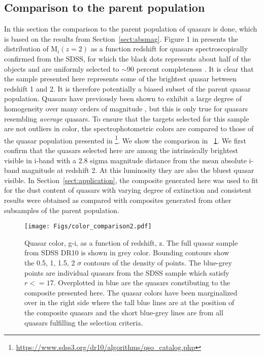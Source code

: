 \documentclass{aa}    %
\newcommand{\figref}[1]{\ref{fig:#1}}
\newcommand{\Fig}[1]{\figurename~\figref{#1}}
\newcommand{\fig}[1]{\Fig{#1}}
\newcommand{\figlabel}[1]{\label{fig:#1}}
\newcommand{\sectionname}{Section}
\newcommand{\Sect}[1]{\sectionname~\ref{sect:#1}}
\newcommand{\sect}[1]{\Sect{#1}}
\newcommand{\sectlabel}[1]{\label{sect:#1}}
\begin{document}
\subsection{Comparison to the parent population}  \sectlabel{parents}
In this section the comparison to the parent population of quasars is done, which is based on the results from \sect{absmag}.
Figure 1 in \cite{Shen2011} presents the distribution of M$_i(z=2)$ as a function redshift for quasars spectroscopically confirmed from the SDSS, for which the black dots represents about half of the objects and are uniformly selected to $\sim$90 percent completeness \citet{Richards2002, VandenBerk2005}. It is clear that the sample presented here represents some of the brightest quasar between redshift 1 and 2. It is therefore potentially a biased subset of the parent quasar population. Quasars have previously been shown to exhibit a large degree of homogeneity over many orders of magnitude \citep{Dietrich2002}, but this is only true for quasars resembling \textit{average} quasars. To ensure that the targets selected for this sample are not outliers in color, the spectrophotometric colors are compared to those of the quasar population presented in \citet{Paris2014}\footnote{\url{https://www.sdss3.org/dr10/algorithms/qso_catalog.php}}. We show the comparison in \fig{color_comparison}. We first confirm that the quasars selected here are among the intrinsically brightest visible in i-band with a 2.8 sigma magnitude distance from the mean absolute i-band magnitude at redshift 2. At this luminosity they are also the bluest quasar visible. In \sect{application}, the composite generated here was used to fit for the dust content of quasars with varying degree of extinction and consistent results were obtained as compared with composites generated from other subsamples of the parent population.


 \begin{figure}[hbtp]
   \centering
   \texttt{[image: Figs/color\_comparison2.pdf]}
   \caption[]{Quasar color, g-i,  as a function of redshift, z. The full quasar sample from SDSS DR10 \citep{Paris2014} is shown in grey color. Bounding contours show the 0.5, 1, 1.5, 2 $\sigma$ contours of the density of points. The blue-grey points are individual quasars from the SDSS sample which satisfy $r <= 17$. Overplotted in blue are the quasars constibuting to the composite presented here. The quasar colors have been marginalized over in the right side where the tall blue lines are at the position of the composite quasars and the short blue-grey lines are from all quasars fulfilling the selection criteria.}
  \figlabel{color_comparison}
 \end{figure}
\end{document}
